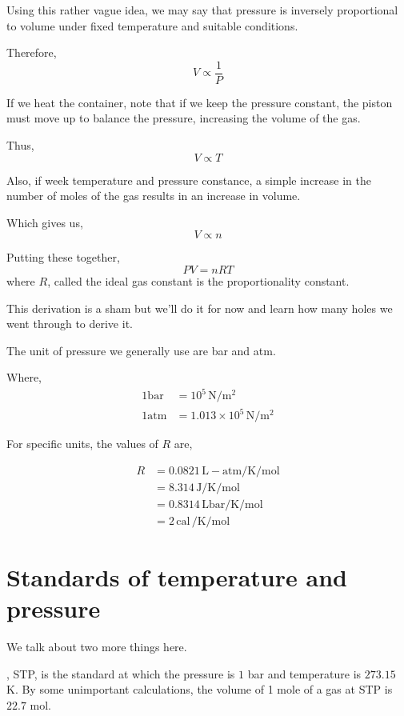 Using this rather vague idea, we may say that pressure is inversely proportional to
volume under fixed temperature and suitable conditions. 

Therefore, 
\[ V \propto \frac{1}{P}\]

If we heat the container, note that if we keep the pressure constant,
the piston must move up to balance the pressure, increasing the volume of the gas.

Thus, 
\[ V \propto T\]

Also, if week temperature and pressure constance, a simple increase
in the number of moles of the gas results in an increase in volume. 


Which gives us,
\[ V \propto n\]

Putting these together, 
\[ PV = nRT\]
where \(R\), called the ideal gas constant is the proportionality constant.

This derivation is a sham but we'll do it for now and learn how many holes we went through
to derive it.

The unit of pressure we generally use are bar and atm. 

Where, 
\begin{align*}
    1 \si{\bar} &= 10^5 \, \si{\newton\per\meter\squared} \\
    1 \mathrm{atm} &= 1.013 \times 10^5 \, \si{\newton\per\meter\squared}
\end{align*}

For specific units, the values of \(R\) are,

\begin{align*}
    R &= 0.0821 \, \si{\liter} - \mathrm{atm} \si{\per\kelvin\per\mole} \\
    &= 8.314 \, \si{\joule\per\kelvin\per\mole} \\
    &= 0.8314 \, \si{\liter\bar\per\kelvin\per\mole} \\
    &= 2 \, \mathrm{cal}\,\si{\per\kelvin\per\mole}
\end{align*}

\section{Standards of temperature and pressure}

We talk about two more things here.

\begin{definition}
  , STP, is
  the standard at which the pressure is \(1\) \si{\bar} and 
  temperature is \(273.15\) \si{\kelvin}.
  By some unimportant calculations, the volume of 1 mole 
  of a gas at STP is \(22.7\) \si{\mole}.
\end{definition}

